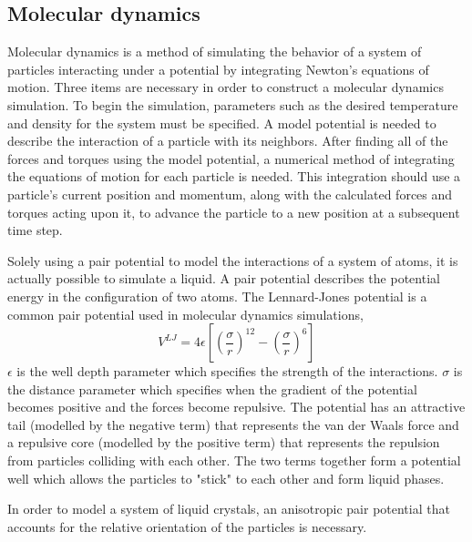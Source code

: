\documentclass[preprint, aps]{revtex4-1}
\begin{document}
\subsection*{Molecular dynamics}
Molecular dynamics is a method of simulating the behavior of a system of 
particles interacting under a potential by integrating Newton's equations of 
motion. Three items are necessary in order to construct a molecular dynamics 
simulation. To begin the simulation, parameters such as the desired temperature
and density for the system must be specified. A model potential is needed
to describe the interaction of a particle with its neighbors. After finding all
of the forces and torques using the model potential, a numerical method of
integrating the equations of motion for each particle is needed. This 
integration should use a particle's current position and momentum, along with 
the calculated forces and torques acting upon it, to advance the particle to a 
new position at a subsequent time step. 	   

Solely using a pair potential to model the interactions of a system of atoms, it
is actually possible to simulate a liquid. A pair potential describes the 
potential energy in the configuration of two atoms. The Lennard-Jones potential is a common pair potential used in molecular dynamics simulations,
	\begin{equation} \label{lennard-jones}
		V^{LJ}=4\epsilon
		\left[
		\left(\frac{\sigma}{r}\right)^{12}
		- \left(\frac{\sigma}{r}\right)^6
		\right]
	\end{equation}
$\epsilon$ is the well depth parameter which specifies the strength of the
interactions. $\sigma$ is the distance parameter which specifies when the
gradient of the potential becomes positive and the forces become repulsive.
The potential has an attractive tail (modelled by the negative term) that
represents the van der Waals force and a repulsive core (modelled by the
positive term) that represents the repulsion from particles colliding with each 
other. The two terms together form a potential well which allows the particles 
to "stick" to each other and form liquid phases. 

In order to model a system of liquid crystals, an anisotropic pair 
potential that accounts for the relative orientation of the particles is 
necessary.
	
\end{document}
